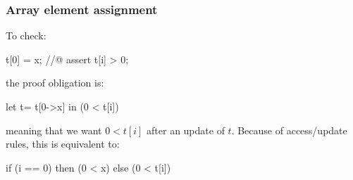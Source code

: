 \subsubsection{Array element assignment}

To check:
\begin{ccode}
  t[0] = x;
  //@ assert t[i] > 0;
\end{ccode}
the proof obligation is:
\begin{whycode}
  let t= t[0->x] in (0 < t[i])
\end{whycode}
meaning that we want $0 < t[i]$ after an update of $t$. Because of access/update
rules, this is equivalent to:
\begin{whycode}
  if (i == 0) then (0 < x) else (0 < t[i])
\end{whycode}

